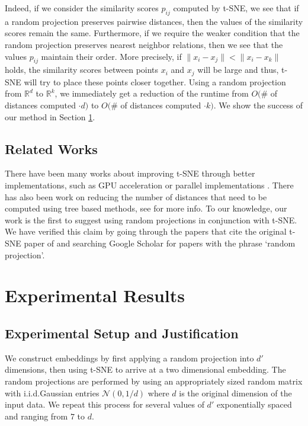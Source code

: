 \documentclass[12pt]{opt2019} %
\begin{document}
Indeed, if we consider the similarity scores $p_{ij}$ computed by t-SNE, we see that if a random projection preserves pairwise distances, then the values of the similarity scores remain the same. Furthermore, if we require the weaker condition that the random projection preserves nearest neighbor relations, then we see that the values $p_{ij }$ maintain their order. More precisely, if $\|x_i - x_j\| < \|x_i - x_k\|$ holds, the similarity scores between points $x_i$ and $x_j$ will be large and thus, t-SNE will try to place these points closer together. Using a random projection from $\mathbb{R}^d$ to $\mathbb{R}^k$, we immediately get a reduction of the runtime from $O($\# of distances computed $\cdot d)$ to $O($\# of distances computed $\cdot k)$.  We show the success of our method in Section \ref{sec:results}.

\subsection{Related Works}
There have been many works about improving t-SNE through better implementations, such as GPU acceleration or parallel implementations \cite{gpu1, gpu2, multicoretsne}. There has also been work on reducing the number of distances that need to be computed using tree based methods, see \cite{treebased} for more info. To our knowledge, our work is the first to suggest using random projections in conjunction with t-SNE. We have verified this claim by going through the papers that cite the original t-SNE paper of \cite{orig_tsne} and searching Google Scholar for papers with the phrase `random projection'.

\section{Experimental Results}\label{sec:results}
\subsection{Experimental Setup and Justification}\label{sec:setup}
We construct embeddings by first applying a random projection into $d'$ dimensions, then using t-SNE to arrive at a two dimensional embedding.  The random projections are performed by using an appropriately sized random matrix with i.i.d.\@ Gaussian entries $\mathcal{N}(0,1/d)$ where $d$ is the original dimension of the input data.  We repeat this process for several values of $d'$ exponentially spaced and ranging from $7$ to $d$.
\end{document}
